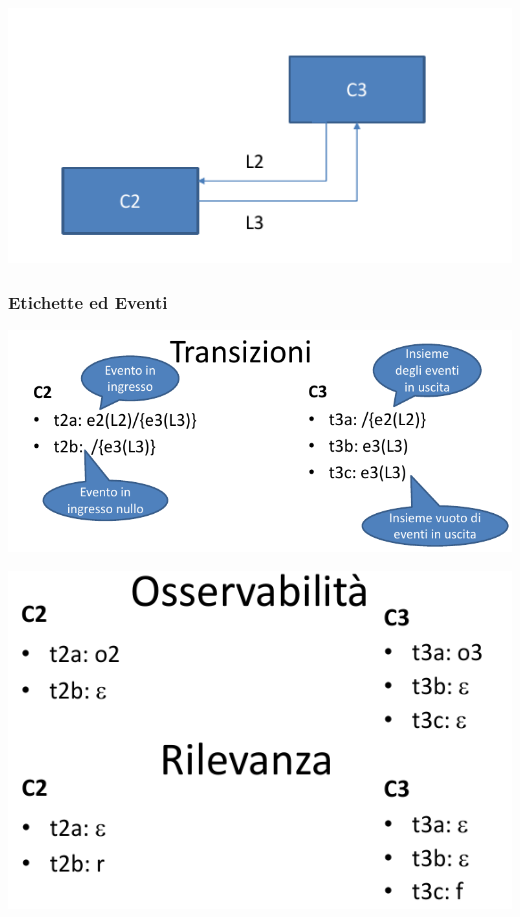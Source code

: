 \includegraphics[width=\textwidth]{immagini/B1top.png}

\subsubsection{Etichette ed Eventi}

\includegraphics[width=\textwidth]{immagini/B1Trans.png}

\includegraphics[width=\textwidth]{immagini/B1Oss.png}

